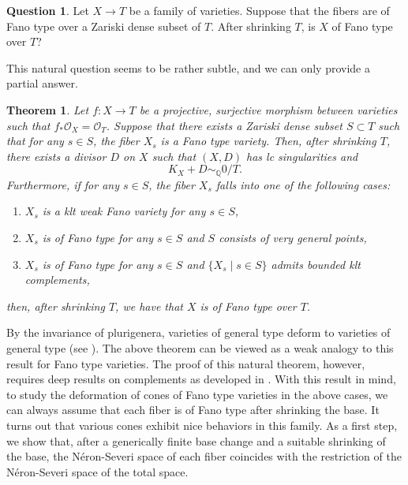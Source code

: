 \documentclass[11pt,oneside,reqno]{amsart}
\numberwithin{equation}{section}
\newtheorem{theorem}[proposition]{Theorem}
\theoremstyle{definition}
\newtheorem{question}[proposition]{Question}
\newcommand{\bQ}{\mathbb{Q}}
\newcommand{\mO}{\mathcal{O}}
\begin{document}
\begin{question}\label{que: FT fiber to FT}
Let $X \to T$ be a family of varieties. Suppose that the fibers are of Fano type over a Zariski dense subset of $T$. After shrinking $T$, is $X$ of Fano type over $T$?
\end{question}

This natural question seems to be rather subtle, and we can only provide a partial answer.

\begin{theorem}\label{thm: FT is constructible}
Let $f: X \to T$ be a projective, surjective morphism between varieties such that $f_*\mO_X=\mO_T$. Suppose that there exists a Zariski dense subset $S\subset T$ such that for any $s\in S$, the fiber $X_s$ is a Fano type variety. Then, after shrinking $T$, there exists a divisor $D$ on $X$ such that $(X, D)$ has lc singularities and
\[
K_X+D \sim_\bQ 0/T.
\] Furthermore, if for any $s\in S$, the fiber $X_s$ falls into one of the following cases:
\begin{enumerate}[label=(\roman*)]
\item $X_s$ is a klt weak Fano variety for any $s\in S$,
\item $X_s$ is of Fano type for any $s\in S$ and $S$ consists of very general points,
\item $X_s$ is of Fano type for any $s\in S$ and $\{X_s \mid s\in S\}$ admits bounded klt complements,
\end{enumerate}
then, after shrinking $T$, we have that $X$ is of Fano type over $T$.
\end{theorem}

By the invariance of plurigenera, varieties of general type deform to varieties of general type (see \cite{HMX18}). The above theorem can be viewed as a weak analogy to this result for Fano type varieties. The proof of this natural theorem, however, requires deep results on complements as developed in \cite{Birkar19}.  With this result in mind, to study the deformation of cones of Fano type varieties in the above cases, we can always assume that each fiber is of Fano type after shrinking the base. It turns out that various cones exhibit nice behaviors in this family. As a first step, we show that, after a generically finite base change and a suitable shrinking of the base, the N\'eron-Severi space of each fiber coincides with the restriction of the N\'eron-Severi space of the total space.
\end{document}
